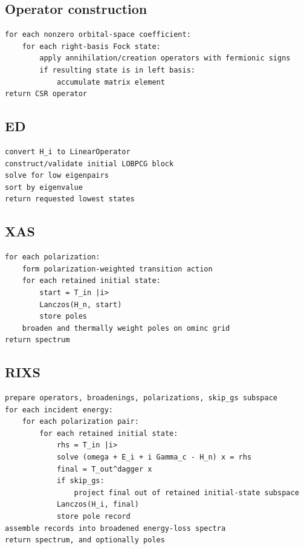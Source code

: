 \documentclass[11pt]{article}
\begin{document}
\subsection{Operator construction}

\begin{lstlisting}
for each nonzero orbital-space coefficient:
    for each right-basis Fock state:
        apply annihilation/creation operators with fermionic signs
        if resulting state is in left basis:
            accumulate matrix element
return CSR operator
\end{lstlisting}

\subsection{ED}

\begin{lstlisting}
convert H_i to LinearOperator
construct/validate initial LOBPCG block
solve for low eigenpairs
sort by eigenvalue
return requested lowest states
\end{lstlisting}

\subsection{XAS}

\begin{lstlisting}
for each polarization:
    form polarization-weighted transition action
    for each retained initial state:
        start = T_in |i>
        Lanczos(H_n, start)
        store poles
    broaden and thermally weight poles on ominc grid
return spectrum
\end{lstlisting}

\subsection{RIXS}

\begin{lstlisting}
prepare operators, broadenings, polarizations, skip_gs subspace
for each incident energy:
    for each polarization pair:
        for each retained initial state:
            rhs = T_in |i>
            solve (omega + E_i + i Gamma_c - H_n) x = rhs
            final = T_out^dagger x
            if skip_gs:
                project final out of retained initial-state subspace
            Lanczos(H_i, final)
            store pole record
assemble records into broadened energy-loss spectra
return spectrum, and optionally poles
\end{lstlisting}
\end{document}
